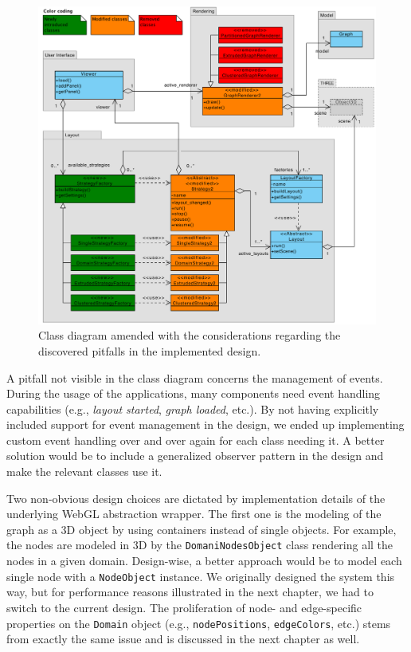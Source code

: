 \begin{figure}
  \begin{adjustwidth}{-2mm}{-1mm} 
    \includegraphics[width=\linewidth]{images/diagrams/class-visu-ok}
  \end{adjustwidth}
  \caption[Amended class diagram with changes highlighted.]{Class diagram amended with the considerations regarding the discovered pitfalls in the implemented design.}
  \label{fig:class-visu-ok}
\end{figure}

A pitfall not visible in the class diagram concerns the management of events. During the usage of the applications, many components need event handling capabilities (e.g., \emph{layout started}, \emph{graph loaded}, etc.). By not having explicitly included support for event management in the design, we ended up implementing custom event handling over and over again for each class needing it. A better solution would be to include a generalized observer pattern in the design and make the relevant classes use it.

Two non-obvious design choices are dictated by implementation details of the underlying WebGL abstraction wrapper. The first one is the modeling of the graph as a 3D object by using containers instead of single objects. For example, the nodes are modeled in 3D by the \texttt{DomaniNodesObject} class rendering all the nodes in a given domain. Design-wise, a better approach would be to model each single node with a \texttt{NodeObject} instance. We originally designed the system this way, but for performance reasons illustrated in the next chapter, we had to switch to the current design. The proliferation of node- and edge-specific properties on the \texttt{Domain} object (e.g., \texttt{nodePositions}, \texttt{edgeColors}, etc.) stems from exactly the same issue and is discussed in the next chapter as well.


